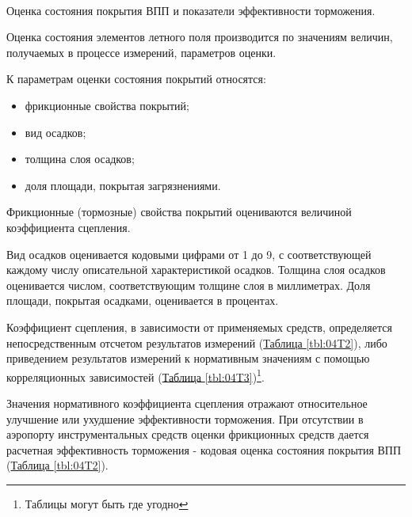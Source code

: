 \paragraph{} Оценка состояния покрытия ВПП и показатели эффективности торможения.

Оценка состояния элементов летного поля производится по значениям величин, получаемых в процессе измерений, параметров оценки.

К параметрам оценки состояния покрытий относятся:
\begin{itemize}
    \item фрикционные свойства покрытий;
    \item вид осадков;
    \item толщина слоя осадков;
    \item доля площади, покрытая загрязнениями.
\end{itemize}


Фрикционные (тормозные) свойства покрытий оцениваются величиной коэффициента сцепления.

Вид осадков оценивается кодовыми цифрами от 1 до 9, с соответствующей каждому числу описательной характеристикой осадков. 
Толщина слоя осадков оценивается числом, соответствующим толщине слоя в миллиметрах. Доля площади, покрытая осадками, оценивается в процентах.

Коэффициент сцепления, в зависимости от применяемых средств, определяется непосредственным отсчетом результатов измерений (\hyperref[tbl:04T2]{Таблица \ref*{tbl:04T2}}), либо приведением результатов измерений к нормативным значениям с помощью корреляционных зависимостей (\hyperref[tbl:04T3]{Таблица \ref*{tbl:04T3}})\footnote{Таблицы могут быть где угодно}.

Значения нормативного коэффициента сцепления отражают относительное улучшение или ухудшение эффективности торможения.
При отсутствии в аэропорту инструментальных средств оценки фрикционных средств дается расчетная эффективность торможения - кодовая оценка состояния покрытия ВПП (\hyperref[tbl:04T2]{Таблица \ref*{tbl:04T2}}).

